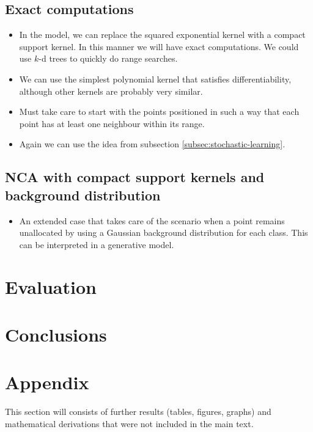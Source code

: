 \documentclass[11pt]{article} %
\begin{document}
	\subsection{Exact computations}
		\begin{itemize}
			\item In the model, we can replace the squared exponential kernel with a compact support kernel. In this manner we will have exact computations. We could use $k$-d trees to quickly do range searches.
			\item We can use the simplest polynomial kernel that satisfies differentiability, although other kernels are probably very similar.
			\item Must take care to start with the points positioned in such a way that each point has at least one neighbour within its range. 
			\item Again we can use the idea from subsection \ref{subsec:stochastic-learning}.
		\end{itemize}
	\subsection{NCA with compact support kernels and background distribution}
		\begin{itemize}
			\item An extended case that takes care of the scenario when a point remains unallocated by using a Gaussian background distribution for each class. This can be interpreted in a generative model. 
		\end{itemize}
		
\section{Evaluation}

\section{Conclusions}




\section*{Appendix}
	This section will consists of further results (tables, figures, graphs) and mathematical derivations that were not included in the main text.
\end{document}
